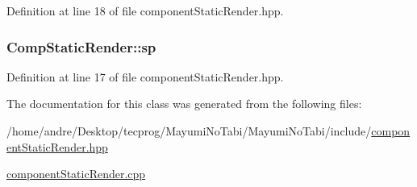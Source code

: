 Definition at line 18 of file component\-Static\-Render.\-hpp.

\hypertarget{class_comp_static_render_a0b0396c860cd01d3572b68558e775ef6}{
\subsubsection[{sp}]{ Comp\-Static\-Render\-::sp}}\label{class_comp_static_render_a0b0396c860cd01d3572b68558e775ef6}


Definition at line 17 of file component\-Static\-Render.\-hpp.



The documentation for this class was generated from the following files\-:\begin{DoxyCompactItemize}
\item 
/home/andre/\-Desktop/tecprog/\-Mayumi\-No\-Tabi/\-Mayumi\-No\-Tabi/include/\hyperlink{component_static_render_8hpp}{component\-Static\-Render.\-hpp}\item 
\hyperlink{component_static_render_8cpp}{component\-Static\-Render.\-cpp}\end{DoxyCompactItemize}

